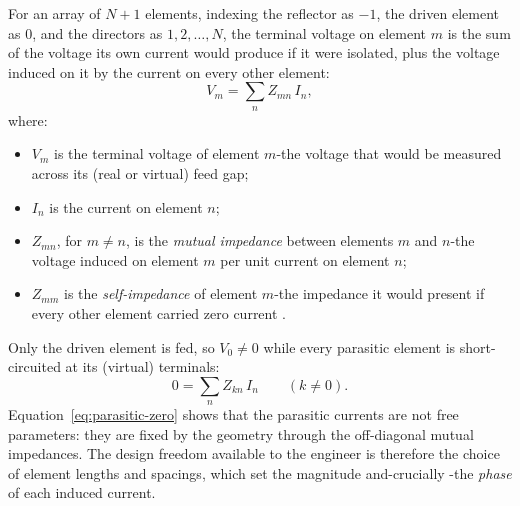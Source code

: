 For an array of $N+1$ elements, indexing the reflector as $-1$, the driven
element as $0$, and the directors as $1,2,\dots,N$, the terminal voltage on
element $m$ is the sum of the voltage its own current would produce if it
were isolated, plus the voltage induced on it by the current on every other
element:
\begin{equation}
    V_m = \sum_{n} Z_{mn}\, I_n ,
    \label{eq:mutual-matrix}
\end{equation}
where:
\begin{itemize}[leftmargin=1.5em,itemsep=1pt,topsep=2pt]
  \item $V_m$ is the terminal voltage of element $m$-the voltage that would
        be measured across its (real or virtual) feed gap;
  \item $I_n$ is the current on element $n$;
  \item $Z_{mn}$, for $m\neq n$, is the \emph{mutual impedance} between
        elements $m$ and $n$-the voltage induced on element $m$ per unit
        current on element $n$;
  \item $Z_{mm}$ is the \emph{self-impedance} of element $m$-the impedance
        it would present if every other element carried zero current
        \citep{balanis2016}.
\end{itemize}
Only the driven element is fed, so $V_0\neq 0$ while every parasitic element is
short-circuited at its (virtual) terminals:
\begin{equation}
    0 = \sum_{n} Z_{kn}\, I_n \qquad (k \neq 0).
    \label{eq:parasitic-zero}
\end{equation}
Equation~\eqref{eq:parasitic-zero} \citep{balanis2016,kraus1988} shows that the parasitic currents are not
free parameters: they are fixed by the geometry through the off-diagonal mutual
impedances. The design freedom available to the engineer is therefore the
choice of element lengths and spacings, which set the magnitude and-crucially
-the \emph{phase} of each induced current.

